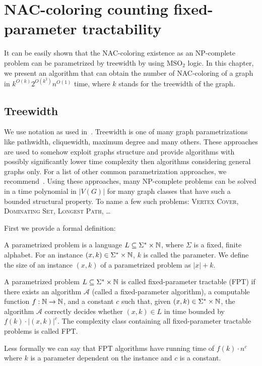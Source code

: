 
\chapter{NAC-coloring counting fixed-parameter tractability}%
\label{chapter:fpt}

\begin{chapterabstract}

	It can be easily shown that the NAC-coloring existence as an NP-complete
	problem can be parametrized by treewidth by using \( \text{MSO}_2 \) logic.
	In this chapter, we present an algorithm that can obtain
	the number of NAC-coloring of a graph in \({k}^{O(k)} 2^{O(k^2)} n^{O(1)}\) time,
	where \(k\) stands for the treewidth of the graph.

\end{chapterabstract}

\section{Treewidth}

We use notation as used in~\cite{book_parametrized_algorithms}.
Treewidth is one of many graph parametrizations like
pathwidth, cliquewidth, maximum degree and many others.
These approaches are used to somehow exploit graphs structure
and provide algorithms with possibly significantly lower time complexity
then algorithms considering general graphs only.
For a list of other common parametrization approaches,
we recommend~\cite{tree_width_comparision_other_classes}.
Using these approaches, many NP-complete problems can be solved
in a time polynomial in \( |V(G)| \)
for many graph classes that have such a bounded structural property.
To name a few such problems:
\textsc{Vertex Cover}, \textsc{Dominating Set}, \textsc{Longest Path}, \dots

First we provide a formal definition:
%
\begin{definition}
	A parametrized problem is a language \( L \subseteq \Sigma^* \times \mathbb{N} \), where
	\( \Sigma \) is a fixed, finite alphabet. For an instance \( (x, k) \in \Sigma^* \times \mathbb{N} \), \( k \) is called the
	parameter.
	We define the size of an instance \( (x, k) \) of a parametrized problem as \( |x| + k \).
\end{definition}
%
\begin{definition}
	A parametrized problem \( L \subseteq \Sigma^* \times \mathbb{N} \) is called fixed-parameter
	tractable (FPT) if there exists an algorithm \( \mathcal{A} \) (called a fixed-parameter
	algorithm), a computable function \( f: \mathbb{N} \to \mathbb{N} \), and a constant
	\( c \) such that, given \( (x, k) \in \Sigma^* \times \mathbb{N} \), the algorithm \( \mathcal{A} \)
	correctly decides
	whether \( (x, k) \in L \) in time bounded by \( f(k) \cdot |(x, k)|^c \). The complexity
	class containing all fixed-parameter tractable problems is called FPT.
\end{definition}
%
Less formally we can say that FPT algorithms
have running time of \( f(k)\cdot n^c \)
where \( k \) is a parameter dependent on the instance
and \( c \) is a constant.

